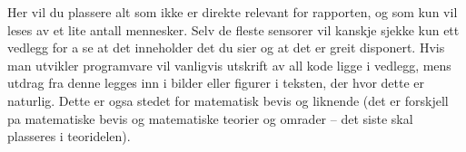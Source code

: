 Her vil du plassere alt som ikke er direkte relevant for rapporten, og som kun vil leses av et lite antall mennesker. Selv de fleste sensorer vil kanskje sjekke kun ett vedlegg for a se at det inneholder det du sier og at det er greit disponert. Hvis man utvikler programvare vil vanligvis utskrift av all kode ligge i vedlegg, mens utdrag fra denne legges inn i bilder eller figurer i teksten, der hvor dette er naturlig. Dette er ogsa stedet for matematisk bevis og liknende (det er forskjell pa matematiske bevis og matematiske teorier og omrader – det siste skal plasseres i teoridelen).